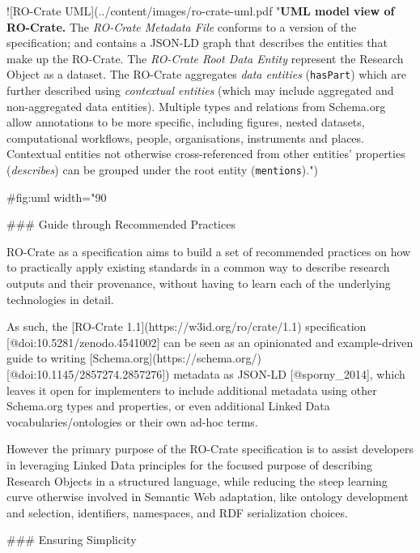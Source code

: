 {![RO-Crate UML](../content/images/ro-crate-uml.pdf "\textbf{UML model view of RO-Crate.} The \emph{RO-Crate Metadata File} conforms to a version of the specification; and contains a JSON-LD graph that describes the entities that make up the RO-Crate. The \emph{RO-Crate Root Data Entity} represent the Research Object as a dataset. The RO-Crate aggregates \emph{data entities} (\texttt{hasPart}) which are further described using \emph{contextual entities} (which may include aggregated and non-aggregated data entities). Multiple types and relations from Schema.org allow annotations to be more specific, including figures, nested datasets, computational workflows, people, organisations, instruments and places. Contextual entities not otherwise cross-referenced from other entities' properties (\emph{describes}) can be grouped under the root entity (\texttt{mentions})."){#fig:uml width="90%



### Guide through Recommended Practices

RO-Crate as a specification aims to build a set of recommended practices on how to practically apply existing standards in a common way to describe research outputs and their provenance, without having to learn each of the underlying technologies in detail.

As such, the [RO-Crate 1.1](https://w3id.org/ro/crate/1.1) specification [@doi:10.5281/zenodo.4541002] can be seen as an opinionated and example-driven guide to writing [Schema.org](https://schema.org/) [@doi:10.1145/2857274.2857276]) metadata as JSON-LD [@sporny_2014], which leaves it open for implementers to include additional metadata using other Schema.org types and properties, or even additional Linked Data vocabularies/ontologies or their own ad-hoc terms.

However the primary purpose of the RO-Crate specification is to assist developers in leveraging Linked Data principles for the focused purpose of describing Research Objects in a structured language, while reducing the steep learning curve otherwise involved in Semantic Web adaptation, like ontology development and selection, identifiers, namespaces, and RDF serialization choices.

### Ensuring Simplicity

}}
